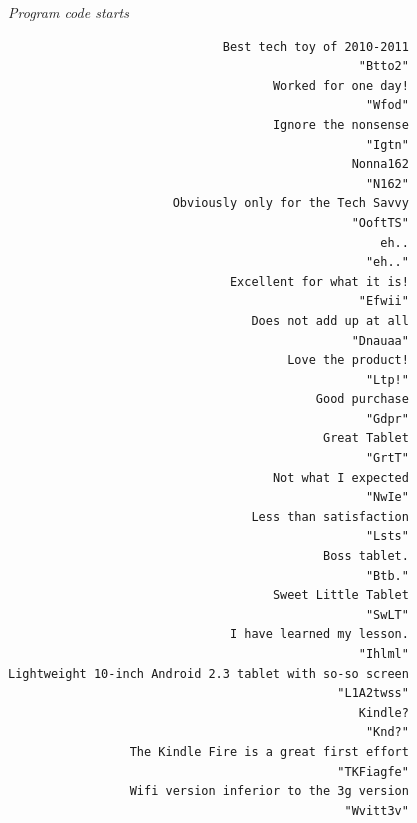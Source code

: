 \emph{Program code starts}

\begin{Shaded}
\begin{Highlighting}[]
\end{Highlighting}
\end{Shaded}

\begin{verbatim}
                              Best tech toy of 2010-2011 
                                                 "Btto2" 
                                     Worked for one day! 
                                                  "Wfod" 
                                     Ignore the nonsense 
                                                  "Igtn" 
                                                Nonna162 
                                                  "N162" 
                       Obviously only for the Tech Savvy 
                                                "OoftTS" 
                                                    eh.. 
                                                  "eh.." 
                               Excellent for what it is! 
                                                 "Efwii" 
                                  Does not add up at all 
                                                "Dnauaa" 
                                       Love the product! 
                                                  "Ltp!" 
                                           Good purchase 
                                                  "Gdpr" 
                                            Great Tablet 
                                                  "GrtT" 
                                     Not what I expected 
                                                  "NwIe" 
                                  Less than satisfaction 
                                                  "Lsts" 
                                            Boss tablet. 
                                                  "Btb." 
                                     Sweet Little Tablet 
                                                  "SwLT" 
                               I have learned my lesson. 
                                                 "Ihlml" 
Lightweight 10-inch Android 2.3 tablet with so-so screen 
                                              "L1A2twss" 
                                                 Kindle? 
                                                  "Knd?" 
                 The Kindle Fire is a great first effort 
                                              "TKFiagfe" 
                 Wifi version inferior to the 3g version 
                                               "Wvitt3v" 
\end{verbatim}

